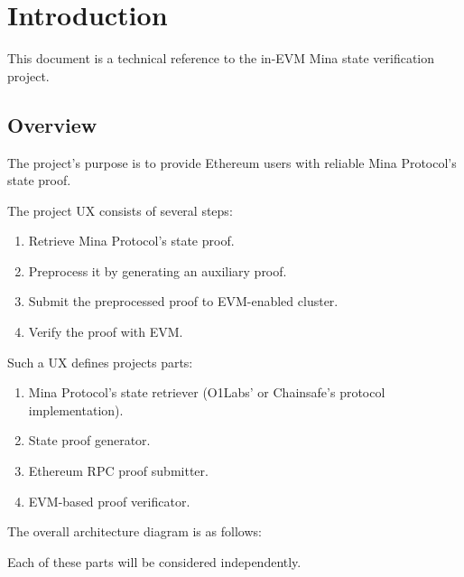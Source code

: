 \chapter{Introduction}

This document is a technical reference to the in-EVM Mina state verification project.

\section{Overview}

The project's purpose is to provide Ethereum users with reliable Mina Protocol's state proof.

The project UX consists of several steps:
\begin{enumerate}
    \item Retrieve Mina Protocol's state proof.
    \item Preprocess it by generating an auxiliary proof.
    \item Submit the preprocessed proof to EVM-enabled cluster.
    \item Verify the proof with EVM.
\end{enumerate}

Such a UX defines projects parts:
\begin{enumerate}
    \item Mina Protocol's state retriever (O1Labs' or Chainsafe's protocol implementation).
    \item State proof generator.
    \item Ethereum RPC proof submitter.
    \item EVM-based proof verificator.
\end{enumerate}

The overall architecture diagram is as follows:

Each of these parts will be considered independently.
